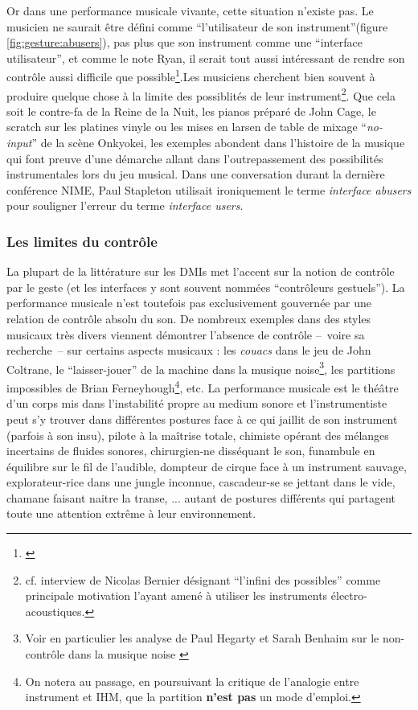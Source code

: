\indent Or dans une performance musicale vivante, cette situation n'existe pas. Le musicien ne saurait être défini comme ``l'utilisateur de son instrument''(figure \ref{fig:gesture:abusers}), pas plus que son instrument comme une ``interface utilisateur'', et comme le note Ryan, il serait tout aussi intéressant de rendre son contrôle aussi difficile que possible\footnote{ \cite{ryan_remarks_1991}}.Les musiciens cherchent bien souvent à produire quelque chose à la limite des possiblités de leur instrument\footnote{cf. interview de Nicolas Bernier désignant ``l'infini des possibles'' comme principale motivation l'ayant amené à utiliser les instruments électro-acoustiques.}. Que cela soit le contre-fa de la Reine de la Nuit, les pianos préparé de John Cage, le scratch sur les platines vinyle ou les mises en larsen de table de mixage ``\textit{no-input}'' de la scène Onkyokei, les exemples abondent dans l'histoire de la musique qui font preuve d'une démarche allant dans l'outrepassement des possibilités instrumentales lors du jeu musical. Dans une conversation durant la dernière conférence NIME, Paul Stapleton utilisait ironiquement le terme \textit{interface abusers} pour souligner l'erreur du terme \textit{interface users}.

\subsubsection{Les limites du contrôle}

\noindent La plupart de la littérature sur les \glspl{DMI} met l'accent sur la notion de contrôle par le geste (et les interfaces y sont souvent nommées ``contrôleurs gestuels''). La performance musicale n'est toutefois pas exclusivement gouvernée par une relation de contrôle absolu du son. De nombreux exemples dans des styles musicaux très divers viennent démontrer l'absence de contrôle --~voire sa recherche~-- sur certains aspects musicaux : les \textit{couacs} dans le jeu de John Coltrane, le ``laisser-jouer'' de la machine dans la musique noise\footnote{Voir en particulier les analyse de Paul Hegarty et Sarah Benhaim sur le non-contrôle dans la musique noise \cite{hegarty_noise_2007, benhaim_aux_2018}}, les partitions impossibles de Brian Ferneyhough\footnote{On notera au passage, en poursuivant la critique de l'analogie entre instrument et \gls{IHM}, que la partition \textbf{n'est pas} un mode d'emploi.}, etc. La performance musicale est le théâtre d'un corps mis dans l'instabilité propre au medium sonore et l'instrumentiste peut s'y trouver dans différentes postures face à ce qui jaillit de son instrument (parfois à son insu), pilote à la maîtrise totale, chimiste opérant des mélanges incertains de fluides sonores, chirurgien-ne disséquant le son, funambule en équilibre sur le fil de l'audible, dompteur de cirque face à un instrument sauvage, explorateur-rice dans une jungle inconnue, cascadeur-se se jettant dans le vide, chamane faisant naitre la transe, ... autant de postures différents qui partagent toute une attention extrême à leur environnement.

